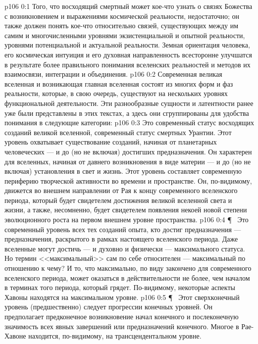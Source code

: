 \vs p106 0:1 Того, что восходящий смертный может кое\hyp{}что узнать о связях Божества с возникновением и выражениями космической реальности, недостаточно; он также должен понять кое\hyp{}что относительно связей, существующих между им самим и многочисленными уровнями экзистенциальной и опытной реальности, уровнями потенциальной и актуальной реальности. Земная ориентация человека, его космическая интуиция и его духовная направленность всесторонне улучшатся в результате более правильного понимания вселенских реальностей и методов их взаимосвязи, интеграции и объединения.
\vs p106 0:2 Современная великая вселенная и возникающая главная вселенная состоят из многих форм и фаз реальности, которые, в свою очередь, существуют на нескольких уровнях функциональной деятельности. Эти разнообразные сущности и латентности ранее уже были представлены в этих текстах, а здесь они сгруппированы для удобства понимания в следующие категории:
\vs p106 0:3 \bibnobreakspace {} Это современный статус восходящих созданий великой вселенной, современный статус смертных Урантии. Этот уровень охватывает существование созданий, начиная от планетарных человеческих --- и до (но не включая) достигших предназначения. Он характерен для вселенных, начиная от давнего возникновения в виде материи --- и до (но не включая) установления в свет и жизнь. Этот уровень составляет современную периферию творческой активности во времени и пространстве. Он, по\hyp{}видимому, движется во внешнем направлении от Рая к концу современного вселенского периода, который будет свидетелем достижения великой вселенной света и жизни, а также, несомненно, будет свидетелем появления некоей новой степени эволюционного роста на первом внешнем уровне пространства.
\vs p106 0:4 \P\ \bibnobreakspace {} Это современный уровень всех тех созданий опыта, кто достиг предназначения --- предназначения, раскрытого в рамках настоящего вселенского периода. Даже вселенные могут достичь --- и духовно и физически --- максимального статуса. Но термин <<максимальный>> сам по себе относителен --- максимальный по отношению к чему? И то, что максимально, по виду закончено для современного вселенского периода, может оказаться в действительности не более, чем началом в терминах того периода, который грядет. По\hyp{}видимому, некоторые аспекты Хавоны находятся на максимальном уровне.
\vs p106 0:5 \P\ \bibnobreakspace {} Этот сверхконечный уровень (предшественно) следует прогрессии конечных уровней. Он предполагает предконечное возникновение начал конечного и послеконечную значимость всех явных завершений или предназначений конечного. Многое в Рае\hyp{}Хавоне находится, по\hyp{}видимому, на трансцендентальном уровне.
